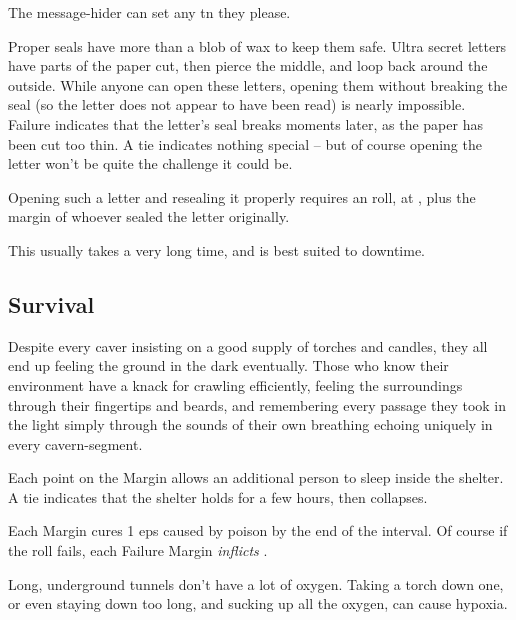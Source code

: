 \begin{multicols}{2}
The message-hider can set any \gls{tn} they please.

Proper seals have more than a blob of wax to keep them safe.
Ultra secret letters have parts of the paper cut, then pierce the middle, and loop back around the outside.
While anyone can open these letters, opening them without breaking the seal (so the letter does not appear to have been read) is nearly impossible.
Failure indicates that the letter's seal breaks moments later, as the paper has been cut too thin.
A tie indicates nothing special -- but of course opening the letter won't be quite the challenge it could be.

Opening such a letter and resealing it properly requires an  roll, at \tn[14], plus the margin of whoever sealed the letter originally.

This usually takes a very long time, and is best suited to \gls{downtime}.

\subsection{Survival}

Despite every caver insisting on a good supply of torches and candles, they all end up feeling the ground in the dark eventually.
Those who know their environment have a knack for crawling efficiently, feeling the surroundings through their fingertips and beards, and remembering every passage they took in the light simply through the sounds of their own breathing echoing uniquely in every cavern-segment.

Each point on the Margin allows an additional person to sleep inside the shelter.
A tie indicates that the shelter holds for a few hours, then collapses.

Each Margin cures 1 \glspl{ep} caused by poison by the end of the \gls{interval}.
Of course if the roll fails, each Failure Margin \emph{inflicts} .

Long, underground tunnels don't have a lot of oxygen.
Taking a torch down one, or even staying down too long, and sucking up all the oxygen, can cause hypoxia.


\end{multicols}
